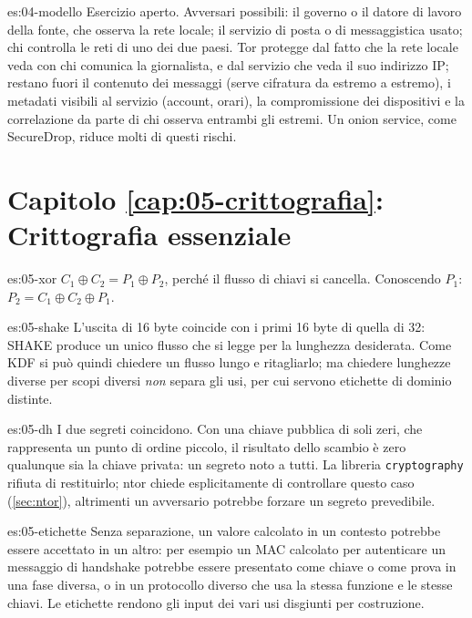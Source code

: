\begin{soluzione}{es:04-modello}
Esercizio aperto. Avversari possibili: il governo o il datore di lavoro della fonte, che osserva la rete locale; il servizio di posta o di messaggistica usato; chi controlla le reti di uno dei due paesi. Tor protegge dal fatto che la rete locale veda con chi comunica la giornalista, e dal servizio che veda il suo indirizzo IP; restano fuori il contenuto dei messaggi (serve cifratura da estremo a estremo), i metadati visibili al servizio (account, orari), la compromissione dei dispositivi e la correlazione da parte di chi osserva entrambi gli estremi. Un onion service, come SecureDrop, riduce molti di questi rischi.
\end{soluzione}

\section*{Capitolo \ref{cap:05-crittografia}: Crittografia essenziale}

\begin{soluzione}{es:05-xor}
$C_1 \oplus C_2 = P_1 \oplus P_2$, perché il flusso di chiavi si cancella. Conoscendo $P_1$: $P_2 = C_1 \oplus C_2 \oplus P_1$.
\end{soluzione}

\begin{soluzione}{es:05-shake}
L'uscita di 16 byte coincide con i primi 16 byte di quella di 32: SHAKE produce un unico flusso che si legge per la lunghezza desiderata. Come KDF si può quindi chiedere un flusso lungo e ritagliarlo; ma chiedere lunghezze diverse per scopi diversi \emph{non} separa gli usi, per cui servono etichette di dominio distinte.
\end{soluzione}

\begin{soluzione}{es:05-dh}
I due segreti coincidono. Con una chiave pubblica di soli zeri, che rappresenta un punto di ordine piccolo, il risultato dello scambio è zero qualunque sia la chiave privata: un segreto noto a tutti. La libreria \texttt{cryptography} rifiuta di restituirlo; ntor chiede esplicitamente di controllare questo caso (\cref{sec:ntor}), altrimenti un avversario potrebbe forzare un segreto prevedibile.
\end{soluzione}

\begin{soluzione}{es:05-etichette}
Senza separazione, un valore calcolato in un contesto potrebbe essere accettato in un altro: per esempio un MAC calcolato per autenticare un messaggio di handshake potrebbe essere presentato come chiave o come prova in una fase diversa, o in un protocollo diverso che usa la stessa funzione e le stesse chiavi. Le etichette rendono gli input dei vari usi disgiunti per costruzione.
\end{soluzione}

